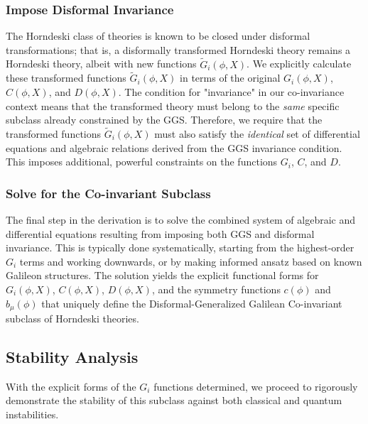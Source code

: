 \documentclass[twocolumn]{aastex631}
\begin{document}
\subsubsection{Impose Disformal Invariance}
The Horndeski class of theories is known to be closed under disformal transformations; that is, a disformally transformed Horndeski theory remains a Horndeski theory, albeit with new functions $\tilde{G}_i(\phi, X)$. We explicitly calculate these transformed functions $\tilde{G}_i(\phi, X)$ in terms of the original $G_i(\phi, X)$, $C(\phi, X)$, and $D(\phi, X)$. The condition for "invariance" in our co-invariance context means that the transformed theory must belong to the \textit{same} specific subclass already constrained by the GGS. Therefore, we require that the transformed functions $\tilde{G}_i(\phi, X)$ must also satisfy the \textit{identical} set of differential equations and algebraic relations derived from the GGS invariance condition. This imposes additional, powerful constraints on the functions $G_i$, $C$, and $D$.

\subsubsection{Solve for the Co-invariant Subclass}
The final step in the derivation is to solve the combined system of algebraic and differential equations resulting from imposing both GGS and disformal invariance. This is typically done systematically, starting from the highest-order $G_i$ terms and working downwards, or by making informed ansatz based on known Galileon structures. The solution yields the explicit functional forms for $G_i(\phi, X)$, $C(\phi, X)$, $D(\phi, X)$, and the symmetry functions $c(\phi)$ and $b_\mu(\phi)$ that uniquely define the Disformal-Generalized Galilean Co-invariant subclass of Horndeski theories.

\subsection{Stability Analysis}
With the explicit forms of the $G_i$ functions determined, we proceed to rigorously demonstrate the stability of this subclass against both classical and quantum instabilities.
\end{document}
